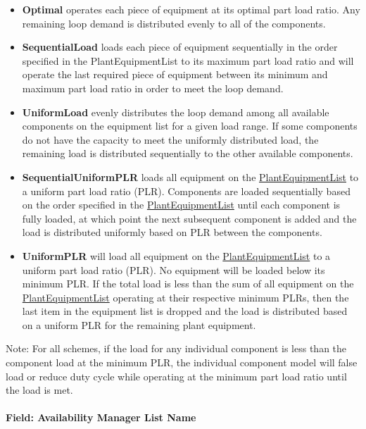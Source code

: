 \begin{itemize}
\item
  \textbf{Optimal} operates each piece of equipment at its optimal part load ratio. Any remaining loop demand is distributed evenly to all of the components.
\item
  \textbf{SequentialLoad} loads each piece of equipment sequentially in the order specified in the PlantEquipmentList to its maximum part load ratio and will operate the last required piece of equipment between its minimum and maximum part load ratio in order to meet the loop demand.
\item
  \textbf{UniformLoad} evenly distributes the loop demand among all available components on the equipment list for a given load range. If some components do not have the capacity to meet the uniformly distributed load, the remaining load is distributed sequentially to the other available components.

\item
  \textbf{SequentialUniformPLR} loads all equipment on the \hyperref[plantequipmentlist]{PlantEquipmentList} to a uniform part load ratio (PLR). Components are loaded sequentially based on the order specified in the \hyperref[plantequipmentlist]{PlantEquipmentList} until each component is fully loaded, at which point the next subsequent component is added and the load is distributed uniformly based on PLR between the components.
\item
  \textbf{UniformPLR} will load all equipment on the \hyperref[plantequipmentlist]{PlantEquipmentList} to a uniform part load ratio (PLR). No equipment will be loaded below its minimum PLR. If the total load is less than the sum of all equipment on the \hyperref[plantequipmentlist]{PlantEquipmentList} operating at their respective minimum PLRs, then the last item in the equipment list is dropped and the load is distributed based on a uniform PLR for the remaining plant equipment.
\end{itemize}

Note: For all schemes, if the load for any individual component is less than the component load at the minimum PLR, the individual component model will false load or reduce duty cycle while operating at the minimum part load ratio until the load is met.

\paragraph{Field: Availability Manager List Name}\label{field-availability-manager-list-name-000}

